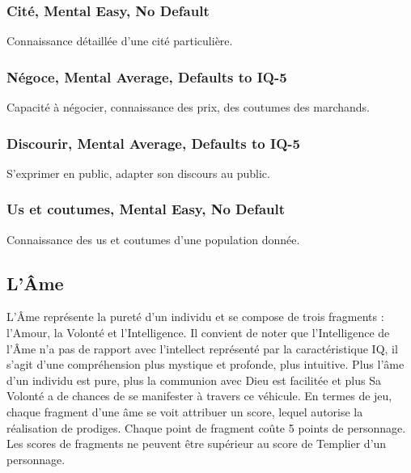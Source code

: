     \subsubsection*{Cité, Mental Easy, No Default}
    Connaissance détaillée d'une cité particulière.
    \subsubsection{Négoce, Mental Average, Defaults to IQ-5}
    Capacité à négocier, connaissance des prix, des coutumes des marchands.
    \subsubsection*{Discourir, Mental Average, Defaults to IQ-5}
    S'exprimer en public, adapter son discours au public.
    \subsubsection*{Us et coutumes, Mental Easy, No Default}
    Connaissance des us et coutumes d'une population donnée.

    \subsection{L'Âme}\label{subsec:ame}
    L'Âme représente la pureté d'un individu et se compose de trois fragments :
    l'Amour, la Volonté et l'Intelligence. Il convient de noter que
    l'Intelligence de l'Âme n'a pas de rapport avec l'intellect représenté par
    la caractéristique IQ, il s'agit d'une compréhension plus mystique et
    profonde, plus intuitive.
    Plus l'âme d'un individu est pure, plus la communion avec Dieu est
    facilitée et plus Sa Volonté a de chances de se manifester à travers ce
    véhicule. En termes de jeu, chaque fragment d'une âme se voit attribuer un
    score, lequel autorise la réalisation de prodiges.
    Chaque point de fragment coûte 5 points de personnage. Les scores de fragments ne peuvent être supérieur au score de Templier d'un personnage.

